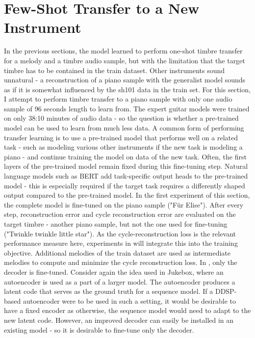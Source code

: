 \section{Few-Shot Transfer to a New Instrument}
\label{transfer}
In the previous sections, the model learned to perform one-shot timbre transfer for a melody and a timbre audio sample, but with the limitation that the target timbre has to be contained in the train dataset. Other instruments sound unnatural - a reconstruction of a piano sample with the generalist model sounds as if it is somewhat influenced by the sh101 data in the train set. \newline
For this section, I attempt to perform timbre transfer to a piano sample with only one audio sample of 96 seconds length to learn from.
The expert guitar models were trained on only 38:10 minutes of audio data - so the question is whether a pre-trained model can be used to learn from much less data. \newline
A common form of performing transfer learning is to use a pre-trained model that performs well on a related task - such as modeling various other instruments if the new task is modeling a piano - and continue training the model on data of the new task.
Often, the first layers of the pre-trained model remain fixed during this fine-tuning step.
Natural language models such as BERT \citep{bert} add task-specific output heads to the pre-trained model - this is especially required if the target task requires a differently shaped output compared to the pre-trained model. \newline
In the first experiment of this section, the complete model is fine-tuned on the piano sample ("Für Elise").
After every step, reconstruction error and cycle reconstruction error are evaluated on the target timbre - another piano sample, but not the one used for fine-tuning ("Twinkle twinkle little star").
As the cycle-reconstruction loss is the relevant performance measure here, experiments in  will integrate this into the training objective. Additional melodies of the train dataset are used as intermediate melodies to compute and minimize the cycle reconstruction loss. \newline
In , only the decoder is fine-tuned.
Consider again the idea used in Jukebox, where an autoencoder is used as a part of a larger model. The autoencoder produces a latent code that serves as the ground truth for a sequence model. If a DDSP-based autoencoder were to be used in such a setting, it would be desirable to have a fixed encoder as otherwise, the sequence model would need to adapt to the new latent code. However, an improved decoder can easily be installed in an existing model - so it is desirable to fine-tune only the decoder. \newline
